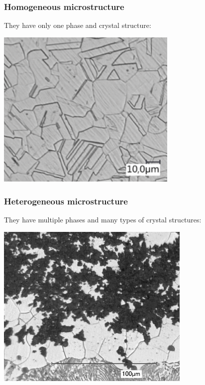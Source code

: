 \documentclass{article}
\begin{document}
\begin{minipage}[t]{0.48\textwidth}
  \subsubsection{Homogeneous microstructure}
  They have only one phase and crystal structure:
  \vspace*{0.8cm}
  \begin{center}
    \includegraphics[width=0.65\textwidth]{media/homogeneous_microstructure.png}
  \end{center}
\end{minipage}
\hfill
\begin{minipage}[t]{0.48\textwidth}
  \subsubsection{Heterogeneous microstructure}
  They have multiple phases and many types of crystal structures:
  \vspace*{0.5cm}
  \begin{center}
    \includegraphics[width=0.7\textwidth]{media/heterogeneous_microstructure.png}
  \end{center}
\end{minipage}
\end{document}
